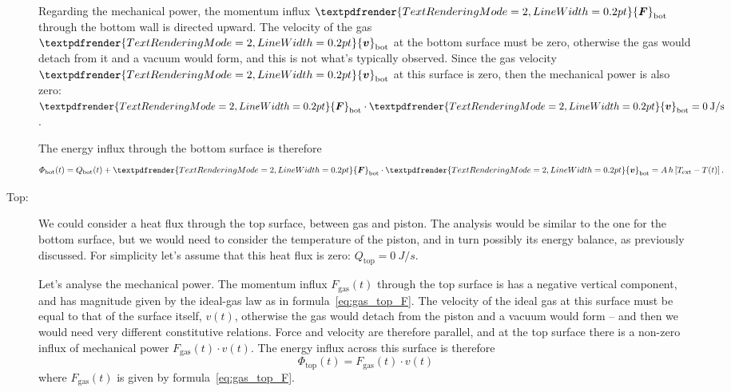 \documentclass[a4paper,12pt,%
onecolumn,oneside,%
british%
]{memoir}
\renewcommand*{\bm}[1]{\textpdfrender{TextRenderingMode=2,LineWidth=0.2pt}{\boldsymbol{#1}}}
\newcommand*{\di}{\mathop{}\!\mathrm{d}}%
\renewcommand*{\|}[1][]{\nonscript\:#1\vert\nonscript\:\mathopen{}}
\newcommand*{\yvis}{\mu} %
\newcommand*{\yhea}{h} %
\newcommand*{\yv}{\bm{v}}
\newcommand*{\dt}{\di t}
\newcommand*{\yN}{N}
\newcommand*{\yH}{\varPhi}%
\newcommand*{\yQ}{Q}%
\newcommand*{\yF}{\bm{F}}
\newcommand*{\yFgas}{F_{\textrm{gas}}}
\newcommand*{\ypr}{p} %
\newcommand*{\yT}{T}%
\newcommand*{\yTe}{\yT_{\text{ext}}}%
\begin{document}
\begin{description}
  Regarding the mechanical power, the momentum influx $\yF_{\textrm{bot}}$ through the bottom wall is directed upward. The velocity of the gas $\yv_{\textrm{bot}}$ at the bottom surface must be zero, otherwise the gas would detach from it and a vacuum would form, and this is not what's typically observed. Since the gas velocity $\yv_{\textrm{bot}}$ at this surface is zero, then the mechanical power is also zero: $\yF_{\textrm{bot}} \cdot \yv_{\textrm{bot}} = \qty{0}{J/s}$.

  The energy influx through the bottom surface is therefore
  \begin{equation*}
    \yH_{\textrm{bot}}(t) = \yQ_{\textrm{bot}}(t)
    + \yF_{\textrm{bot}} \cdot \yv_{\textrm{bot}}
    = A\,\yhea\,[\yTe-\yT(t)] \,.
  \end{equation*}

\item[Top:] We could consider a heat flux through the top surface, between gas and piston. The analysis would be similar to the one for the bottom surface, but we would need to consider the temperature of the piston, and in turn possibly its energy balance, as previously discussed. For simplicity let's assume that this heat flux is zero: $\yQ_{\text{top}} = \qty{0}{J/s}$.

  Let's analyse the mechanical power. The momentum influx $\yFgas(t)$ through the top surface is has a negative vertical component, and has magnitude given by the ideal-gas law as in formula~\eqref{eq:gas_top_F}. The velocity of the ideal gas at this surface must be equal to that of the surface itself, $v(t)$, otherwise the gas would detach from the piston and a vacuum would form -- and then we would need very different constitutive relations. Force and velocity are therefore parallel, and at the top surface there is a non-zero influx of mechanical power $\yFgas(t)\cdot v(t)$. The energy influx across this surface is therefore
  \begin{equation*}
    \yH_{\textrm{top}}(t) = \yFgas(t)\cdot v(t)
  \end{equation*}
where $\yFgas(t)$ is given by formula~\eqref{eq:gas_top_F}.
\end{description}
\end{document}
